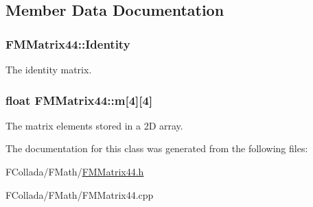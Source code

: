 \subsection{Member Data Documentation}
\hypertarget{classFMMatrix44_a6ec620d68ab61a95e3b4b5f7e7300468}{
\subsubsection[{Identity}]{ {\bf FMMatrix44::Identity}}}
\label{classFMMatrix44_a6ec620d68ab61a95e3b4b5f7e7300468}
The identity matrix. \hypertarget{classFMMatrix44_a709b1f27940c291ea1482866d3a165d0}{
\subsubsection[{m}]{\setlength{\rightskip}{0pt plus 5cm}float {\bf FMMatrix44::m}\mbox{[}4\mbox{]}\mbox{[}4\mbox{]}}}
\label{classFMMatrix44_a709b1f27940c291ea1482866d3a165d0}
The matrix elements stored in a 2D array. 

The documentation for this class was generated from the following files:\begin{DoxyCompactItemize}
\item 
FCollada/FMath/\hyperlink{FMMatrix44_8h}{FMMatrix44.h}\item 
FCollada/FMath/FMMatrix44.cpp\end{DoxyCompactItemize}
